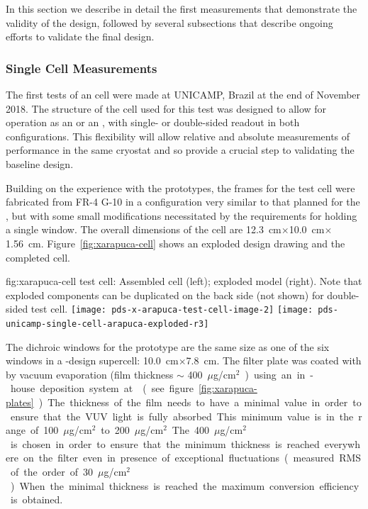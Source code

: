 In this section we describe in detail the first measurements that demonstrate the validity of the design, followed by several subsections that describe ongoing efforts to validate the final design.

\subsubsection{Single Cell  Measurements}
\label{sec:xarapuca-unicamp}

The first tests of an  cell were made at UNICAMP, Brazil at the end of November 2018. 
The structure of the cell used for this test was designed to allow for operation as an  or an , with single- or double-sided readout in both configurations.  This flexibility will allow relative and absolute measurements of performance in the same cryostat and so provide a crucial step to validating the baseline design.

Building on the experience with the  prototypes, the frames for the test cell were fabricated from FR-4 G-10 in a configuration very similar to that planned for the , but with some small modifications necessitated by the requirements for holding a single window. The overall dimensions of the cell are \SI{12.3}{cm}$\times$\SI{10.0}{cm}$\times$\SI{1.56}{cm}. Figure~\ref{fig:xarapuca-cell} shows an exploded design drawing and the completed cell. 

\begin{dunefigure}{fig:xarapuca-cell}
{ test cell:  Assembled cell (left); exploded model (right).  Note that exploded components can be duplicated on the back side (not shown) for double-sided test cell.} 
	\texttt{[image: pds-x-arapuca-test-cell-image-2]}
	    \texttt{[image: pds-unicamp-single-cell-arapuca-exploded-r3]}
\end{dunefigure}


The dichroic windows for the prototype are the same size as one of the six windows in a -design  supercell: \SI{10.0}{cm}$\times$\SI{7.8}{cm}. The filter plate was coated with  by vacuum evaporation (film thickness $\sim$ \SI{400}{${\mu}$g/cm$^2$})  using an in-house deposition system at  (see figure \ref{fig:xarapuca-plates}). 
The thickness of the film needs to have a minimal value in order to ensure that the VUV light is fully absorbed. This minimum value is in the range of \SI{100}{${\mu}$g/cm$^2$} to \SI{200}{${\mu}$g/cm$^2$}. The  \SI{400}{${\mu}$g/cm$^2$} is chosen in order to ensure that the minimum thickness is reached everywhere on the filter even in presence of exceptional fluctuations (measured RMS of the order of \SI{30}{${\mu}$g/cm$^2$}). When the minimal thickness is reached the maximum conversion efficiency is obtained.

